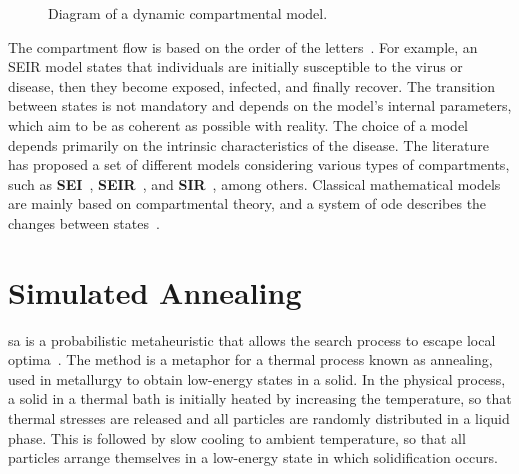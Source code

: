 \begin{figure}[!ht]
{

	} \caption{Diagram of a dynamic compartmental model.}
	\label{fig:dynamicmodel}
\end{figure}

The compartment flow is based on the order of the letters~\citep{amaku:2014}.
For example, an SEIR model states that individuals are initially susceptible to
the virus or disease, then they become exposed, infected, and finally recover.
The transition between states is not mandatory and depends on the model's
internal parameters, which aim to be as coherent as possible with reality. The
choice of a model depends primarily on the intrinsic characteristics of the
disease. The literature has proposed a set of different models considering
various types of compartments, such as \textbf{SEI}~\cite{Scoglio2021,
	Puntipa2023}, \textbf{SEIR}~\cite{Scoglio2021, Puntipa2023, Meng2023,
	da-silva:2020}, and \textbf{SIR}~\cite{Umar2022, Prasetyo2023, Srivastav2023},
among others.  Classical mathematical models are mainly based on compartmental
theory, and a system of \gls{ode} describes the changes between
states~\citep{da-silva:2020}.

\section{Simulated Annealing}\label{sec:simulated-annealing}

\gls{sa} is a probabilistic metaheuristic that allows the search process to
escape local optima~\cite{kirkpatrick:1983}. The method is a metaphor for a
thermal process known as annealing, used in metallurgy to obtain low-energy
states in a solid. In the physical process, a solid in a thermal bath is
initially heated by increasing the temperature, so that thermal stresses are
released and all particles are randomly distributed in a liquid phase. This is
followed by slow cooling to ambient temperature, so that all particles arrange
themselves in a low-energy state in which solidification occurs.

